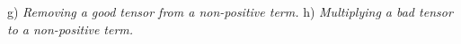 \documentclass{article}
\newcommand{\luc}[1]{{\bf \textcolor{red}{{Luc: #1}}}}
\newcommand{\stefano}[1]{{\bf \textcolor{violet}{{Stefano: #1}}}}
\newcommand{\tensors}{\ensuremath{\mathcal{T}}\xspace}
\newcommand{\indices}{\ensuremath{\mathcal{I}}\xspace}
\newcommand{\factors}{\ensuremath{\mathcal{X}}\xspace}
\newcommand{\TERM}[2]{\ensuremath{\mathrm{term}_{#1,#2}}\xspace}
\renewcommand\[{\begin{equation}}
\renewcommand\]{\end{equation}}
\newcommand{\TB}{\textbf{B}\xspace}
\newcommand{\TG}{\textbf{G}\xspace}
\newcommand{\TN}{\textbf{N}\xspace}
\newcommand{\TX}{\textbf{X}\xspace}
\newcommand{\TZ}{\textbf{Z}\xspace}
\begin{document}
g) \emph{Removing a good tensor from a non-positive term.}
h) \emph{Multiplying a bad tensor to a non-positive term.}
\noindent
%
%
%
\end{document}
